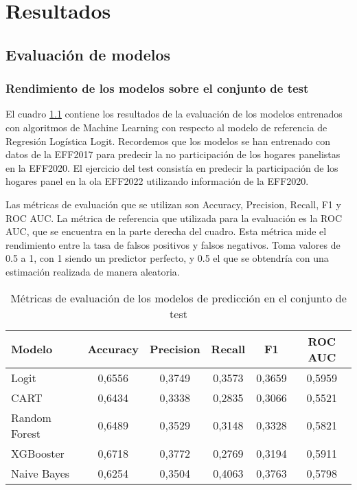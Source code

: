 \chapter{Resultados}
\label{chapter:resultados}

\section{Evaluación de modelos}
\label{section:evaluation_models}

\subsection*{Rendimiento de los modelos sobre el conjunto de test}

El cuadro \ref{table:test} contiene los resultados de la evaluación de los modelos entrenados con algoritmos de Machine Learning con respecto al modelo de referencia de Regresión Logística Logit. Recordemos que los modelos se han entrenado con datos de la EFF2017 para predecir la no participación de los hogares panelistas en la EFF2020. El ejercicio del test consistía en predecir la participación de los hogares panel en la ola EFF2022 utilizando información de la EFF2020.

Las métricas de evaluación que se utilizan son Accuracy, Precision, Recall, F1 y ROC AUC. La métrica de referencia que utilizada para la evaluación es la ROC AUC, que se encuentra en la parte derecha del cuadro. Esta métrica mide el rendimiento entre la tasa de falsos positivos y falsos negativos. Toma valores de 0.5 a 1, con 1 siendo un predictor perfecto, y 0.5 el que se obtendría con una estimación realizada de manera aleatoria.

\begin{table}[ht]
    \centering
    \begin{tabular}{lccccc}
    \hline
        \textbf{Modelo} & \textbf{Accuracy} & \textbf{Precision} & \textbf{Recall} & \textbf{F1} & \textbf{ROC AUC} \\ \hline
        Logit & 0,6556 & 0,3749 & 0,3573 & 0,3659 & 0,5959 \\ 
        CART & 0,6434 & 0,3338 & 0,2835 & 0,3066 & 0,5521 \\ 
        Random Forest & 0,6489 & 0,3529 & 0,3148 & 0,3328 & 0,5821 \\ 
        XGBooster & 0,6718 & 0,3772 & 0,2769 & 0,3194 & 0,5911 \\ 
        Naive Bayes & 0,6254 & 0,3504 & 0,4063 & 0,3763 & 0,5798 \\ \hline
    \end{tabular}
    \caption{Métricas de evaluación de los modelos de predicción en el conjunto de test}
    \label{table:test}
\end{table}

